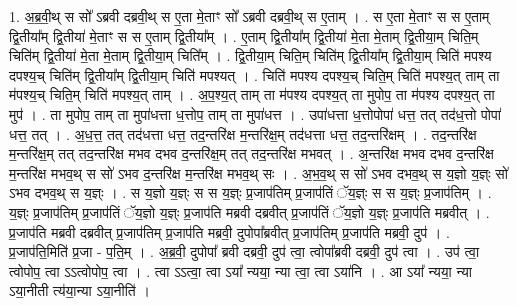 \documentclass[17pt]{extarticle}
\begin{document}
1. अ॒ब्र॒वी॒थ् स सो᳚ ऽब्रवी दब्रवी॒थ् स ए॒ता मे॒ताꣳ सो᳚ ऽब्रवी दब्रवी॒थ् स ए॒ताम् । . स ए॒ता मे॒ताꣳ स स ए॒ताम् द्वि॒तीया᳚म् द्वि॒तीया॑ मे॒ताꣳ स स ए॒ताम् द्वि॒तीया᳚म् । . ए॒ताम् द्वि॒तीया᳚म् द्वि॒तीया॑ मे॒ता मे॒ताम् द्वि॒तीया॒म् चिति॒म् चिति॑म् द्वि॒तीया॑ मे॒ता मे॒ताम् द्वि॒तीया॒म् चिति᳚म् । . द्वि॒तीया॒म् चिति॒म् चिति॑म् द्वि॒तीया᳚म् द्वि॒तीया॒म् चिति॑ मपश्य दपश्य॒च् चिति॑म् द्वि॒तीया᳚म् द्वि॒तीया॒म् चिति॑ मपश्यत् । . चिति॑ मपश्य दपश्य॒च् चिति॒म् चिति॑ मपश्य॒त् ताम् ता म॑पश्य॒च् चिति॒म् चिति॑ मपश्य॒त् ताम् । . अ॒प॒श्य॒त् ताम् ता म॑पश्य दपश्य॒त् ता मुपोप॒ ता म॑पश्य दपश्य॒त् ता मुप॑ । . ता मुपोप॒ ताम् ता मुपा॑धत्ता ध॒त्तोप॒ ताम् ता मुपा॑धत्त । . उपा॑धत्ता ध॒त्तोपोपा॑ धत्त॒ तत् तद॑ध॒त्तो पोपा॑ धत्त॒ तत् । . अ॒ध॒त्त॒ तत् तद॑धत्ता धत्त॒ तद॒न्तरि॑क्ष म॒न्तरि॑क्ष॒म् तद॑धत्ता धत्त॒ तद॒न्तरि॑क्षम् । . तद॒न्तरि॑क्ष म॒न्तरि॑क्ष॒म् तत् तद॒न्तरि॑क्ष मभव दभव द॒न्तरि॑क्ष॒म् तत् तद॒न्तरि॑क्ष मभवत् । . अ॒न्तरि॑क्ष मभव दभव द॒न्तरि॑क्ष म॒न्तरि॑क्ष मभव॒थ् स सो॑ ऽभव द॒न्तरि॑क्ष म॒न्तरि॑क्ष मभव॒थ् सः । . अ॒भ॒व॒थ् स सो॑ ऽभव दभव॒थ् स य॒ज्ञो य॒ज्ञ्ः सो॑ ऽभव दभव॒थ् स य॒ज्ञ्ः । . स य॒ज्ञो य॒ज्ञ्ः स स य॒ज्ञ्ः प्र॒जाप॑तिम् प्र॒जाप॑तिं ॅय॒ज्ञ्ः स स य॒ज्ञ्ः प्र॒जाप॑तिम् । . य॒ज्ञ्ः प्र॒जाप॑तिम् प्र॒जाप॑तिं ॅय॒ज्ञो य॒ज्ञ्ः प्र॒जाप॑ति मब्रवी दब्रवीत् प्र॒जाप॑तिं ॅय॒ज्ञो य॒ज्ञ्ः प्र॒जाप॑ति मब्रवीत् । . प्र॒जाप॑ति मब्रवी दब्रवीत् प्र॒जाप॑तिम् प्र॒जाप॑ति मब्रवी॒ दुपोपा᳚ब्रवीत् प्र॒जाप॑तिम् प्र॒जाप॑ति मब्रवी॒ दुप॑ । . प्र॒जाप॑ति॒मिति॑ प्र॒जा - प॒ति॒म् । . अ॒ब्र॒वी॒ दुपोपा᳚ ब्रवी दब्रवी॒ दुप॑ त्वा॒ त्वोपा᳚ब्रवी दब्रवी॒ दुप॑ त्वा । . उप॑ त्वा॒ त्वोपोप॒ त्वा ऽऽत्वोपोप॒ त्वा । . त्वा ऽऽत्वा॒ त्वा ऽया᳚ न्यया॒ न्या त्वा॒ त्वा ऽया॑नि । . आ ऽया᳚ न्यया॒ न्या ऽया॒नीती त्य॑या॒न्या ऽया॒नीति॑ । \newline
\end{document}
